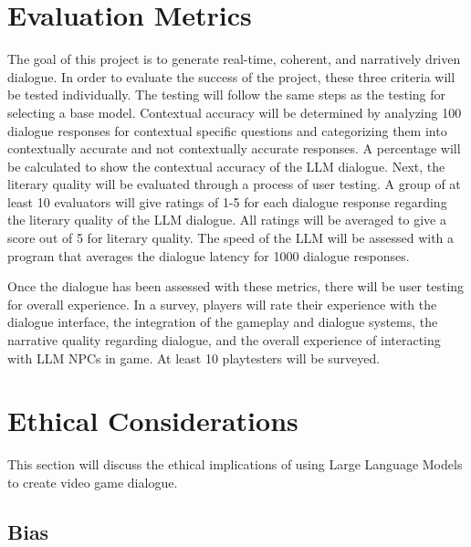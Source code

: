 \documentclass[10pt,twocolumn]{article}
\begin{document}
\section{Evaluation Metrics}

    \par 
    The goal of this project is to generate real-time, coherent, and narratively driven dialogue. In order to evaluate the success of the project, these three criteria will be tested individually. The testing will follow the same steps as the testing for selecting a base model. Contextual accuracy will be determined by analyzing 100 dialogue responses for contextual specific questions and categorizing them into contextually accurate and not contextually accurate responses. A percentage will be calculated to show the contextual accuracy of the LLM dialogue. Next, the literary quality will be evaluated through a process of user testing. A group of at least 10 evaluators will give ratings of 1-5 for each dialogue response regarding the literary quality of the LLM dialogue. All ratings will be averaged to give a score out of 5 for literary quality. The speed of the LLM will be assessed with a program that averages the dialogue latency for 1000 dialogue responses.

    \par
    Once the dialogue has been assessed with these metrics, there will be user testing for overall experience. In a survey, players will rate their experience with the dialogue interface, the integration of the gameplay and dialogue systems, the narrative quality regarding dialogue, and the overall experience of interacting with LLM NPCs in game. At least 10 playtesters will be surveyed. 

\section{Ethical Considerations}

    \par 
    This section will discuss the ethical implications of using Large Language Models to create video game dialogue. 

    \subsection{Bias}
\end{document}
